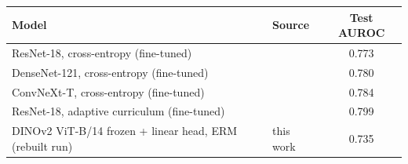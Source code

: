 \begin{center}\small
\begin{tabular}{llc}\toprule
Model & Source & Test AUROC \\\midrule
ResNet-18, cross-entropy (fine-tuned) & \citet{gong2022acl} & 0.773 \\
DenseNet-121, cross-entropy (fine-tuned) & \citet{gong2022acl} & 0.780 \\
ConvNeXt-T, cross-entropy (fine-tuned) & \citet{gong2022acl} & 0.784 \\
ResNet-18, adaptive curriculum (fine-tuned) & \citet{gong2022acl} & 0.799 \\
DINOv2 ViT-B/14 frozen + linear head, ERM (rebuilt run) & this work & 0.735 \\
\bottomrule\end{tabular}\end{center}
